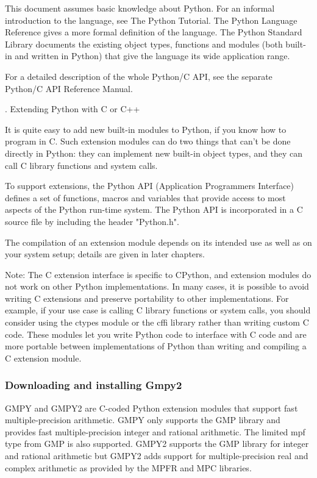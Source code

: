This document assumes basic knowledge about Python. For an informal introduction to the language, see The Python Tutorial. The Python Language Reference gives a more formal definition of the language. The Python Standard Library documents the existing object types, functions and modules (both built-in and written in Python) that give the language its wide application range.

For a detailed description of the whole Python/C API, see the separate Python/C API Reference Manual.

. Extending Python with C or C++

It is quite easy to add new built-in modules to Python, if you know how to program in C. Such extension modules can do two things that can’t be done directly in Python: they can implement new built-in object types, and they can call C library functions and system calls.

To support extensions, the Python API (Application Programmers Interface) defines a set of functions, macros and variables that provide access to most aspects of the Python run-time system. The Python API is incorporated in a C source file by including the header "Python.h".

The compilation of an extension module depends on its intended use as well as on your system setup; details are given in later chapters.

Note:
The C extension interface is specific to CPython, and extension modules do not work on other Python implementations. In many cases, it is possible to avoid writing C extensions and preserve portability to other implementations. For example, if your use case is calling C library functions or system calls, you should consider using the ctypes module or the cffi library rather than writing custom C code. These modules let you write Python code to interface with C code and are more portable between implementations of Python than writing and compiling a C extension module.


\subsubsection{Downloading and installing Gmpy2}

GMPY and GMPY2 are C-coded Python extension modules that support fast multiple-precision arithmetic. GMPY only supports the GMP library and provides fast multiple-precision integer and rational arithmetic. The limited mpf type from GMP is also supported. GMPY2 supports the GMP library for integer and rational arithmetic but GMPY2 adds support for multiple-precision real and complex arithmetic as provided by the MPFR and MPC libraries. 

